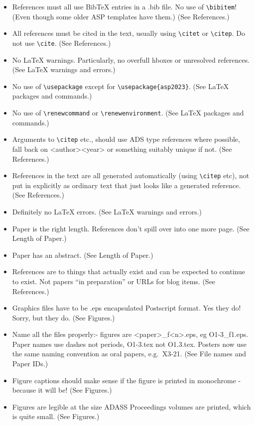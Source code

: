 \documentclass[11pt,twoside]{article}
\begin{document}
\begin{itemize}
\checklistitemize

\item References must all use BibTeX entries in a .bib file. No use of \verb"\bibitem"! (Even though some older ASP templates have them.) (See References.)
\item All references must be cited in the text, usually using \verb"\citet" or \verb"\citep".  Do not use \verb"\cite". (See References.)
\item No LaTeX warnings. Particularly, no overfull hboxes or unresolved references. (See LaTeX warnings and errors.)
\item No use of \verb"\usepackage" except for \verb"\usepackage{asp2023}". (See LaTeX packages and commands.)
\item No use of \verb"\renewcommand" or \verb"\renewenvironment". (See LaTeX packages and commands.)
\item Arguments to \verb"\citep" etc., should use ADS type references where possible, fall back on <author><year> or something suitably unique if not. (See References.)
\item References in the text are all generated automatically (using \verb"\citep" etc), not put in explicitly as ordinary text that just looks like a generated reference. (See References.)
\item Definitely no LaTeX errors. (See LaTeX warnings and errors.)
\item Paper is the right length. References don't spill over into one more page. (See Length of Paper.)
\item Paper has an abstract. (See Length of Paper.)
\item References are to things that actually exist and can be expected to continue to exist. Not papers ``in preparation'' or URLs for blog items. (See References.)
\item Graphics files have to be .eps encapsulated Postscript format. Yes they do! Sorry, but they do. (See Figures.)
\item Name all the files properly:- figures are <paper>\_f<n>.eps, eg O1-3\_f1.eps. Paper names use dashes not periods, O1-3.tex not O1.3.tex. Posters now use the same naming convention as oral papers, e.g.\ X3-21. (See File names and Paper IDs.)
\item Figure captions should make sense if the figure is printed in monochrome - because it will be! (See Figures.)
\item Figures are legible at the size ADASS Proceedings volumes are printed, which is quite small. (See Figures.)

\end{itemize}
\end{document}
